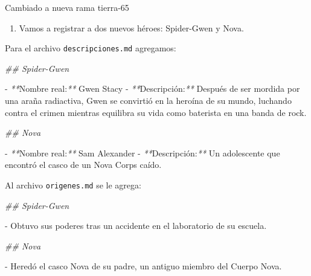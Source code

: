 \documentclass[
]{book}
\newenvironment{Shaded}{\begin{snugshade}}{\end{snugshade}}
\newcommand{\CommentTok}[1]{\textcolor[rgb]{0.56,0.35,0.01}{\textit{#1}}}
\newcommand{\ExtensionTok}[1]{#1}
\newcommand{\NormalTok}[1]{#1}
\newcommand{\PreprocessorTok}[1]{\textcolor[rgb]{0.56,0.35,0.01}{\textit{#1}}}
\newcommand{\StringTok}[1]{\textcolor[rgb]{0.31,0.60,0.02}{#1}}
\providecommand{\tightlist}{%
  \setlength{\itemsep}{0pt}\setlength{\parskip}{0pt}}
\begin{document}
\begin{Shaded}
\begin{Highlighting}[]
\ExtensionTok{Cambiado}\NormalTok{ a nueva rama }\StringTok{\textquotesingle{}tierra{-}65\textquotesingle{}}
\end{Highlighting}
\end{Shaded}

\begin{enumerate}
\def\labelenumi{\arabic{enumi}.}
\setcounter{enumi}{1}
\tightlist
\item
  Vamos a registrar a dos nuevos héroes: Spider-Gwen y Nova.
\end{enumerate}

Para el archivo \texttt{descripciones.md} agregamos:

\begin{Shaded}
\begin{Highlighting}[]

\CommentTok{\#\# Spider{-}Gwen}

\ExtensionTok{{-}} \PreprocessorTok{**}\NormalTok{Nombre real:}\PreprocessorTok{**}\NormalTok{ Gwen Stacy}
\ExtensionTok{{-}} \PreprocessorTok{**}\NormalTok{Descripción:}\PreprocessorTok{**}\NormalTok{ Después de ser mordida por una araña radiactiva, Gwen se convirtió en la heroína de su mundo, luchando contra el crimen mientras equilibra su vida como baterista en una banda de rock.}

\CommentTok{\#\# Nova}

\ExtensionTok{{-}} \PreprocessorTok{**}\NormalTok{Nombre real:}\PreprocessorTok{**}\NormalTok{ Sam Alexander}
\ExtensionTok{{-}} \PreprocessorTok{**}\NormalTok{Descripción:}\PreprocessorTok{**}\NormalTok{ Un adolescente que encontró el casco de un Nova Corps caído.}
\end{Highlighting}
\end{Shaded}

Al archivo \texttt{origenes.md} se le agrega:

\begin{Shaded}
\begin{Highlighting}[]

\CommentTok{\#\# Spider{-}Gwen}

\ExtensionTok{{-}}\NormalTok{ Obtuvo sus poderes tras un accidente en el laboratorio de su escuela.}

\CommentTok{\#\# Nova}

\ExtensionTok{{-}}\NormalTok{ Heredó el casco Nova de su padre, un antiguo miembro del Cuerpo Nova.}
\end{Highlighting}
\end{Shaded}
\end{document}
